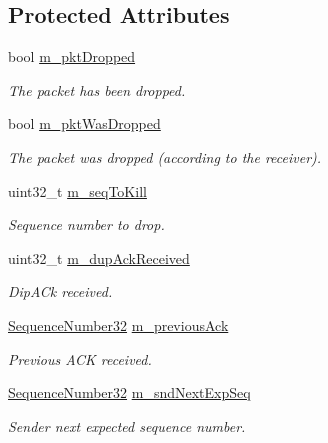 \subsection*{Protected Attributes}
\begin{DoxyCompactItemize}
\item 
bool \hyperlink{classTcpFastRetrTest_a6f788b1f0d2392952d2eebb8305a41ad}{m\+\_\+pkt\+Dropped}
\begin{DoxyCompactList}\small\item\em The packet has been dropped. \end{DoxyCompactList}\item 
bool \hyperlink{classTcpFastRetrTest_aba8f48c5cde79cfd8d9d197a72fe1980}{m\+\_\+pkt\+Was\+Dropped}
\begin{DoxyCompactList}\small\item\em The packet was dropped (according to the receiver). \end{DoxyCompactList}\item 
uint32\+\_\+t \hyperlink{classTcpFastRetrTest_a3064a7c9176cf9822ad2c98fcfab9e7f}{m\+\_\+seq\+To\+Kill}
\begin{DoxyCompactList}\small\item\em Sequence number to drop. \end{DoxyCompactList}\item 
uint32\+\_\+t \hyperlink{classTcpFastRetrTest_aedcc941670077c95d80cffa2258530aa}{m\+\_\+dup\+Ack\+Received}
\begin{DoxyCompactList}\small\item\em Dip\+A\+Ck received. \end{DoxyCompactList}\item 
\hyperlink{group__network_gacb2070e4e98d2d5135c9bede58f07a03}{Sequence\+Number32} \hyperlink{classTcpFastRetrTest_a85126260ef5786c98001ffb28708d489}{m\+\_\+previous\+Ack}
\begin{DoxyCompactList}\small\item\em Previous A\+CK received. \end{DoxyCompactList}\item 
\hyperlink{group__network_gacb2070e4e98d2d5135c9bede58f07a03}{Sequence\+Number32} \hyperlink{classTcpFastRetrTest_a39e5dc90efb03fa4e0743990e5d53c58}{m\+\_\+snd\+Next\+Exp\+Seq}
\begin{DoxyCompactList}\small\item\em Sender next expected sequence number. \end{DoxyCompactList}\item 

\end{DoxyCompactItemize}
